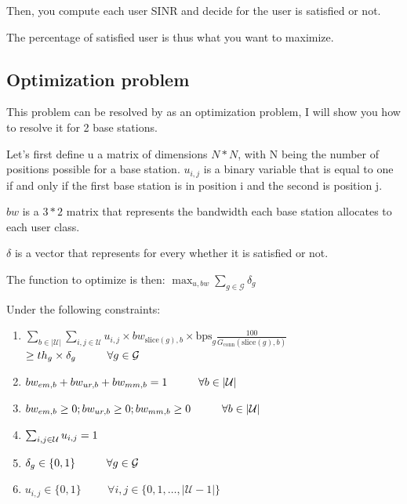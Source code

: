 \documentclass[letterpaper]{article}
\begin{document}
Then, you compute each user SINR and decide for the user is satisfied or not.

The percentage of satisfied user is thus what you want to maximize.

\subsection{Optimization problem}

This problem can be resolved by as an optimization problem, I will show you how to resolve it for 2 base stations.

Let's first define u a matrix of dimensions $N*N$, with N being the number of positions possible for a base station.
$u_{i,j}$ is a binary variable that is equal to one if and only if the first base station is in position i and the second is position j.

$bw$ is a $3*2$ matrix that represents the bandwidth each base station allocates to each user class.

$\delta$ is a vector that represents for every whether it is satisfied or not.

The function to optimize is then: $\max_{u,bw}\sum_{g\in\mathcal{G}}\delta_g$

Under the following constraints:

\begin{enumerate}
    \item $\sum_{b \in |\mathcal{U}|} \sum_{i, j \in \mathcal{U}} u_{i, j} \times bw_{\text{slice}(g), b} \times \text{bps}_g \frac{100}{G_{\text{conn}}(\text{slice}(g),b)} \nonumber$
    $\geq th_g \times \delta_g \hspace{1cm} \forall g \in \mathcal{G} \\[1em]$
    \item $bw_{em,b} + bw_{ur,b} + bw_{mm,b} = 1 \hspace{1cm} \forall b \in |\mathcal{U}| \\[1em]$
    \item $bw_{em,b} \geq 0; bw_{ur,b} \geq 0; bw_{mm,b} \geq 0 \hspace{1cm} \forall b \in |\mathcal{U}| \\[1em]$
    \item $\sum_{i,j \in \mathcal{U}}u_{i,j} = 1 \\[1em]$
    \item $\delta_g \in \{0, 1\} \hspace{1cm} \forall g \in \mathcal{G} \\[1em] $
    \item $u_{i,j} \in \{0, 1\} \hspace{1cm} \forall i,j \in \{0, 1, \ldots , |\mathcal{U}-1|\}$
\end{enumerate}
\end{document}
